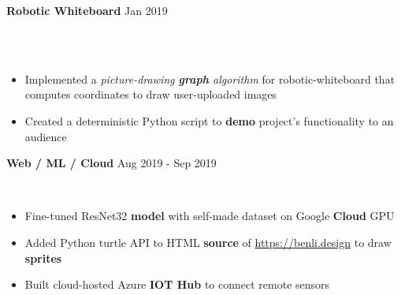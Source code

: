 \documentclass[a4paper]{article}
\begin{document}
{\textbf{Robotic Whiteboard} \hfill Jan 2019\\\\
\vspace{-2mm}
	\item[]
	\\
\vspace{-1mm}
\begin{itemize} \itemsep 0.5pt
	\item Implemented a \textit{picture-drawing \textbf{graph} algorithm} for robotic-whiteboard that computes coordinates to draw user-uploaded images
    \item Created a deterministic Python script to \textbf{demo} project’s functionality to an audience
\end{itemize}
\vspace*{2mm}

\textbf{Web / ML / Cloud} \hfill Aug 2019 - Sep 2019\\
\vspace{-2mm}
	\item[]
	\\
\vspace{-1mm}
\begin{itemize} \itemsep 0.5pt
	\item Fine-tuned ResNet32 \textbf{model} with self-made dataset on Google \textbf{Cloud} GPU
	\item Added Python turtle API to HTML \textbf{source} of \url{https://benli.design} to draw \textbf{sprites}
	\item Built cloud-hosted Azure \textbf{IOT Hub} to connect remote sensors
\end{itemize}
\vspace*{2mm}

}
\end{document}
